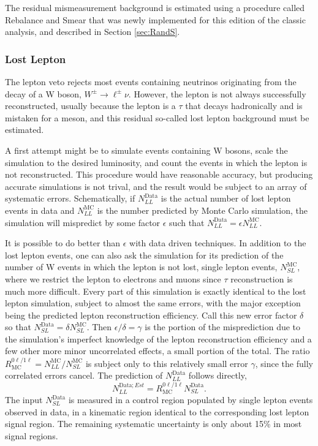     The residual mismeasurement background is estimated using a procedure called Rebalance and Smear that was newly implemented for this edition of the classic analysis, and described in Section \ref{sec:RandS}.
    
    \subsubsection{Lost Lepton} \label{sec:MT2lostlep}

    The lepton veto rejects most events containing neutrinos originating from the decay of a W boson, $W^{\pm}\rightarrow \ell^{\pm}\nu$.
    However, the lepton is not always successfully reconstructed, usually because the lepton is a $\tau$ that decays hadronically and is mistaken for a meson, and this residual so-called lost lepton background must be estimated. 

    A first attempt might be to simulate events containing W bosons, scale the simulation to the desired luminosity, and count the events in which the lepton is not reconstructed.
    This procedure would have reasonable accuracy, but producing accurate simulations is not trival, and the result would be subject to an array of systematic errors.
    Schematically, if $N_{LL}^{\mathrm{Data}}$ is the actual number of lost lepton events in data and $N_{LL}^{\mathrm{MC}}$ is the number predicted by Monte Carlo simulation, the simulation will mispredict by some factor $\epsilon$ such that $N_{LL}^{\mathrm{Data}} = \epsilon N_{LL}^{\mathrm{MC}}$.

    It is possible to do better than $\epsilon$ with data driven techniques.
    In addition to the lost lepton events, one can also ask the simulation for its prediction of the number of W events in which the lepton is not lost, single lepton events, $N_{SL}^{\mathrm{MC}}$, where we restrict the lepton to electrons and muons since $\tau$ reconstruction is much more difficult.
    Every part of this simulation is exactly identical to the lost lepton simulation, subject to almost the same errors, with the major exception being the predicted lepton reconstruction efficiency.
    Call this new error factor $\delta$ so that $N_{SL}^{\mathrm{Data}}=\delta N_{SL}^{\mathrm{MC}}$.
    Then $\epsilon/\delta = \gamma$ is the portion of the misprediction due to the simulation's imperfect knowledge of the lepton reconstruction efficiency and a few other more minor uncorrelated effects, a small portion of the total.
    The ratio $R_{\mathrm{MC}}^{0\ell/1\ell} = N_{LL}^{\mathrm{MC}} / N_{SL}^{\mathrm{MC}}$ is subject only to this relatively small error $\gamma$, since the fully correlated errors cancel.
    The prediction of $N_{LL}^{\mathrm{Data}}$ follows directly,
    \begin{equation}
      N_{LL}^{\mathrm{Data};Est} = R_{\mathrm{MC}}^{0\ell/1\ell} N_{SL}^{\mathrm{Data}}.
    \end{equation}
    The input $N_{SL}^{\mathrm{Data}}$ is measured in a control region populated by single lepton events observed in data, in a kinematic region identical to the corresponding lost lepton signal region.
    The remaining systematic uncertainty is only about 15\% in most signal regions.

